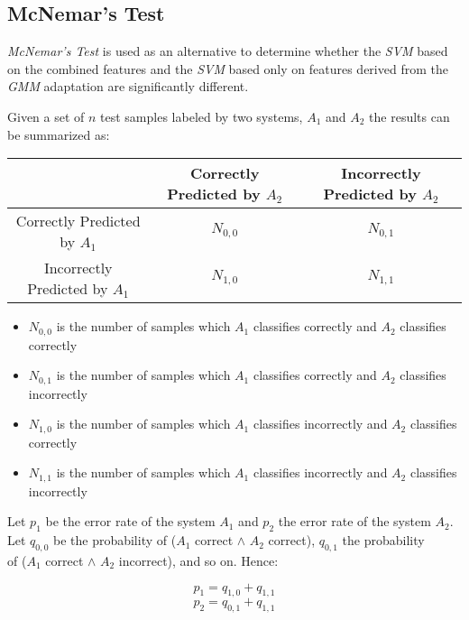 \subsection{McNemar's Test} \label{subsection:mcnemar}

\textit{McNemar's Test} \cite{mcnemar}
is used as an alternative to determine whether the \textit{SVM}
based on the combined features and the \textit{SVM} based only on features
derived from the \textit{GMM} adaptation are significantly different.

Given a set of $n$ test samples labeled by two systems, $A_{1}$ and $A_{2}$
the results can be summarized as:

\begin{center}
    \begin{tabular}{ | c | c | c | }
    \hline
    & Correctly Predicted by $A_{2}$ & Incorrectly Predicted by $A_{2}$ \\ \hline
    Correctly Predicted by $A_{1}$ & $N_{0,0}$ & $N_{0,1}$ \\ \hline
    Incorrectly Predicted by $A_{1}$ & $N_{1,0}$ & $N_{1,1}$ \\ \hline
    \end{tabular}
\end{center}

\begin{itemize}
\item{$N_{0, 0}$ is the number of samples which $A_{1}$ classifies correctly and $A_{2}$ classifies correctly}
\item{$N_{0, 1}$ is the number of samples which $A_{1}$ classifies correctly and $A_{2}$ classifies incorrectly}
\item{$N_{1, 0}$ is the number of samples which $A_{1}$ classifies incorrectly and $A_{2}$ classifies correctly}
\item{$N_{1, 1}$ is the number of samples which $A_{1}$ classifies incorrectly and $A_{2}$ classifies incorrectly}
\end{itemize}

Let $p_{1}$ be the error rate of the system $A_{1}$ and $p_{2}$ the error rate of the
system $A_{2}$. \\
Let $q_{0,0}$ be the probability of ($A_{1}$ correct $\land$ $A_{2}$ correct),
$q_{0,1}$ the probability \\ of ($A_{1}$ correct $\land$ $A_{2}$ incorrect), and so on. Hence:

\begin{multicols}{2}
  \noindent
  \begin{equation}
    p_{1} = q_{1,0} + q_{1,1}
  \end{equation}
  \begin{equation}
    p_{2} = q_{0,1} + q_{1,1}
  \end{equation}
\end{multicols}


